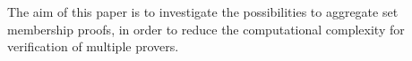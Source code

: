 The aim of this paper is to investigate the possibilities to aggregate set membership proofs, in order to reduce the computational complexity for verification of multiple provers.










